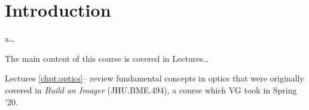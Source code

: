 \chapter*{Introduction}

 a\ldots

The main content of this course is covered in Lectures\ldots

Lectures \ref{chpt:optics}-- review fundamental concepts in optics that were originally covered in \textit{Build an Imager} (JHU.BME.494), a course which VG took in Spring '20.